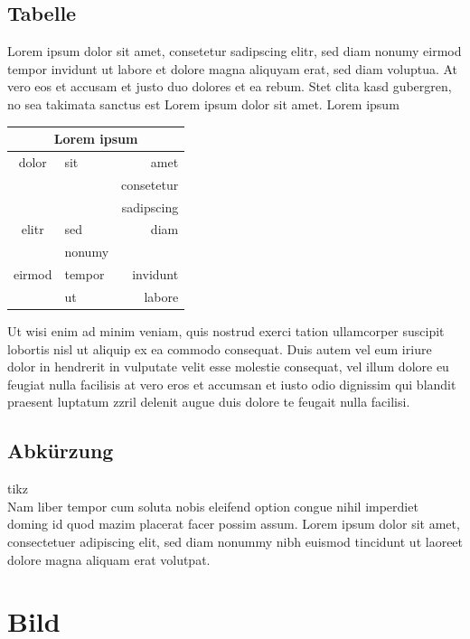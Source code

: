 \subsection{Tabelle}
Lorem ipsum dolor sit amet, consetetur sadipscing elitr, sed diam nonumy eirmod tempor invidunt ut labore et dolore magna aliquyam erat, sed diam voluptua. At vero eos et accusam et justo duo dolores et ea rebum. Stet clita kasd gubergren, no sea takimata sanctus est Lorem ipsum dolor sit amet. Lorem ipsum 

\begin{center}
\begin{tabular}{||c||l|r||}
\hline
\multicolumn{3}{||c||}{Lorem ipsum} \\
\hline
dolor &  sit & amet \\
& & consetetur \\
& & sadipscing \\
\hline
elitr & sed & diam \\
& nonumy & \\
\hline
eirmod & tempor & invidunt \\
& ut & labore\\
\hline
\end{tabular}
\label{table2}
\end{center}

Ut wisi enim ad minim veniam, quis nostrud exerci tation ullamcorper suscipit lobortis nisl ut aliquip ex ea commodo consequat. Duis autem vel eum iriure dolor in hendrerit in vulputate velit esse molestie consequat, vel illum dolore eu feugiat nulla facilisis at vero eros et accumsan et iusto odio dignissim qui blandit praesent luptatum zzril delenit augue duis dolore te feugait nulla facilisi.   

\subsection{Abkürzung}

 \acs{tikz}\\

Nam liber tempor cum soluta nobis eleifend option congue nihil imperdiet doming id quod mazim placerat facer possim assum. Lorem ipsum dolor sit amet, consectetuer adipiscing elit, sed diam nonummy nibh euismod tincidunt ut laoreet dolore magna aliquam erat volutpat.

\newpage
\section{Bild}

